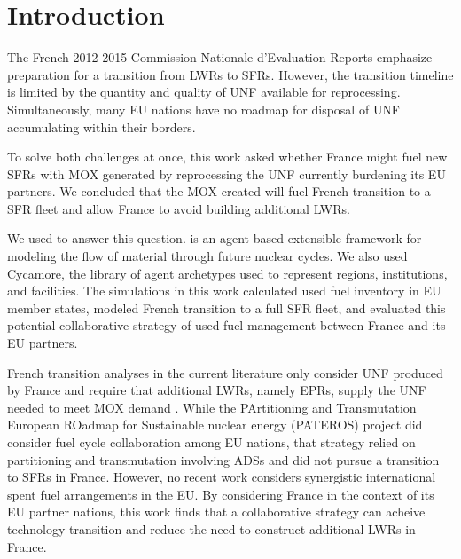 
\section{Introduction}
The French 2012-2015 Commission Nationale d'Evaluation Reports
\cite{cne2_reports_2015} emphasize preparation for a transition from \glspl{LWR} to \glspl{SFR}.
However, the transition timeline is limited by the quantity and quality 
of \gls{UNF} available for reprocessing. Simultaneously, many \gls{EU} nations 
have no roadmap for disposal of \gls{UNF} accumulating within their borders.

To solve both challenges at once, this work asked whether France might fuel new 
\glspl{SFR} with \gls{MOX} generated by reprocessing the \gls{UNF} currently 
burdening its \gls{EU} partners. We concluded that the \gls{MOX} created will 
fuel French transition to a \gls{SFR} fleet and allow France to avoid building 
additional \glspl{LWR}.

We used \Cyclus \cite{huff_fundamental_2016} to answer this question. 
\Cyclus is an agent-based extensible framework for modeling the flow of 
material through future nuclear cycles. We also used Cycamore, the library of 
\Cyclus agent archetypes used to represent regions, institutions, and facilities. The simulations 
in this work calculated used fuel inventory in \gls{EU} member states, modeled French 
transition to a full \gls{SFR} fleet, and evaluated this potential collaborative
strategy of used fuel management between France and its \gls{EU} partners.

French transition analyses in the current literature only consider \gls{UNF}
produced by France and require that additional \glspl{LWR}, namely \glspl{EPR},
supply the \gls{UNF} needed to meet \gls{MOX} demand \cite{carre_overview_2009,
martin_symbiotic_2017, freynet_multiobjective_2016}.  While the PArtitioning
and  Transmutation  European ROadmap  for  Sustainable nuclear  energy
(PATEROS) project \cite{fazio_study_2013, 
martinez-val_pateros_2009,rodriguez_analysis_2014} did consider fuel cycle collaboration
among \gls{EU} nations, that strategy relied on partitioning and transmutation
involving \glspl{ADS} and did not pursue a transition to \glspl{SFR} in France.  However, no recent work considers synergistic
international spent fuel arrangements in the \gls{EU}.  By considering France
in the context of its \gls{EU} partner nations, this work finds that a
collaborative strategy can acheive technology transition and reduce the need to
construct additional \glspl{LWR} in France.
